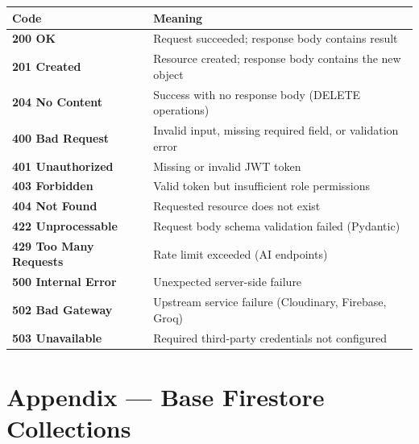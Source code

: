\documentclass[12pt,a4paper]{article}
\begin{document}
\begin{tabularx}{\linewidth}{>{\ttfamily\bfseries}l X}
\toprule
Code & Meaning \\
\midrule
200 OK             & Request succeeded; response body contains result \\
201 Created        & Resource created; response body contains the new object \\
204 No Content     & Success with no response body (DELETE operations) \\
400 Bad Request    & Invalid input, missing required field, or validation error \\
401 Unauthorized   & Missing or invalid JWT token \\
403 Forbidden      & Valid token but insufficient role permissions \\
404 Not Found      & Requested resource does not exist \\
422 Unprocessable  & Request body schema validation failed (Pydantic) \\
429 Too Many Requests & Rate limit exceeded (AI endpoints) \\
500 Internal Error & Unexpected server-side failure \\
502 Bad Gateway    & Upstream service failure (Cloudinary, Firebase, Groq) \\
503 Unavailable    & Required third-party credentials not configured \\
\bottomrule
\end{tabularx}

\vspace{1cm}

\section*{Appendix — Base Firestore Collections}
\end{document}
